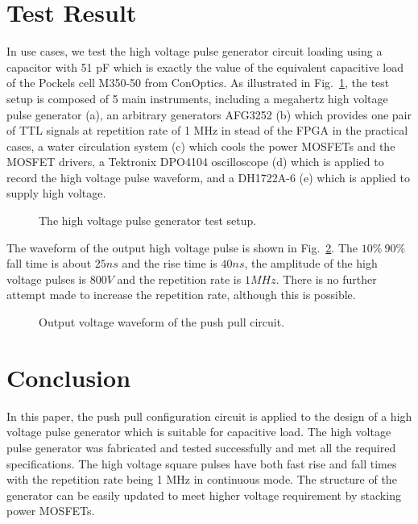 \documentclass[aip,rsi,reprint,graphicx]{revtex4-1} %
\begin{document}
\section{Test Result}
In use cases, we test the high voltage pulse generator circuit loading using a capacitor with 51 pF which is exactly the value of the equivalent capacitive load of the Pockels cell M350-50 from ConOptics.  As illustrated in Fig.~\ref{FIG3}, the test setup is composed of 5 main instruments, including a megahertz high voltage pulse generator (a), an arbitrary generators AFG3252 (b) which provides one pair of TTL signals at repetition rate of 1 MHz in stead of the FPGA in the practical cases, a water circulation system (c) which cools the power MOSFETs and the MOSFET drivers,  
a Tektronix DPO4104 oscilloscope (d) which is applied to record the high voltage pulse waveform, and a DH1722A-6 (e) which is applied to supply high voltage.
\begin{figure}[hbt]
\caption{The high voltage pulse generator test setup. \label{FIG3}}%
\end{figure}
The waveform of the output high voltage pulse is shown in Fig.~\ref{Fig4}. The $10\%~90\%$ fall time is about $25ns$ and the rise time is $40 ns$, the amplitude of the high voltage pulses is $800V$ and the repetition rate is $1MHz$. There is no further attempt made to increase the repetition rate, although this is possible.
\begin{figure}[hbt]
\caption{Output voltage waveform of the push pull circuit.\label{Fig4}}%
\end{figure}

\section{Conclusion}
In this paper, the push pull configuration circuit is applied to the design of a high voltage pulse generator which is suitable for capacitive load. The high voltage pulse generator was fabricated and tested successfully and met all the required specifications. The high voltage square pulses have both fast rise and fall times with the repetition rate being 1 MHz in continuous mode. The structure of the generator can be easily updated to meet higher voltage requirement by stacking power MOSFETs\cite{baker1992stacking,baker1993series}.
\end{document}

